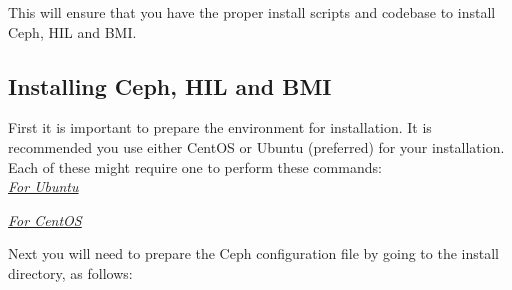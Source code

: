 \pagebreak


This will ensure that you have the proper install scripts and codebase to install Ceph, HIL and BMI.

\pagebreak

\subsection{Installing Ceph, HIL and BMI}

First it is important to prepare the environment for installation.  It is recommended you use either CentOS or Ubuntu (preferred) for your installation.  Each of these might require one to perform these commands: \\

\underline{\emph{For Ubuntu}} 


\underline{\emph{For CentOS}} 


Next you will need to prepare the Ceph configuration file by going to the install directory, as follows:

